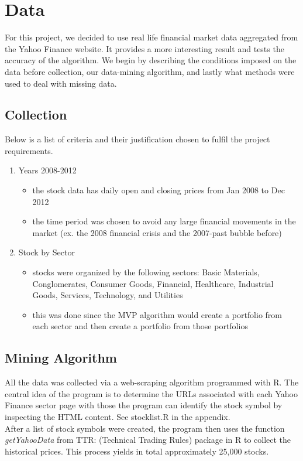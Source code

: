 \documentclass{article}
\begin{document}
\section{Data}
For this project, we decided to use real life financial market data aggregated from the Yahoo Finance website. It provides a more interesting result and tests the accuracy of the algorithm. We begin by describing the conditions imposed on the data before collection, our data-mining algorithm, and lastly what methods were used to deal with missing data.
\subsection{Collection}
Below is a list of criteria and their justification chosen to fulfil the project requirements. 
\begin{enumerate}
\item Years 2008-2012
\begin{itemize}
\item the stock data has daily open and closing prices from Jan 2008 to Dec 2012
\item the time period was chosen to avoid any large financial movements in the market (ex. the 2008 financial crisis and the 2007-past bubble before)
\end{itemize}
\item Stock by Sector
\begin{itemize}
\item stocks were organized by the following sectors: Basic Materials, Conglomerates, Consumer Goods, Financial, Healthcare, Industrial Goods, Services, Technology, and Utilities
\item this was done since the MVP algorithm would create a portfolio from each sector and then create a portfolio from those portfolios
\end{itemize}
\end{enumerate}

\subsection{Mining Algorithm}
All the data was collected via a web-scraping algorithm programmed with R. The central idea of the program is to determine the URLs associated with each Yahoo Finance sector page with those the program can identify the stock symbol by inspecting the HTML content. See stocklist.R in the appendix.\\

After a list of stock symbols were created, the program then uses the function \textit{getYahooData} from TTR: (Technical Trading Rules) package in R to collect the historical prices. This process yields in total approximately 25,000 stocks. 
\end{document}
